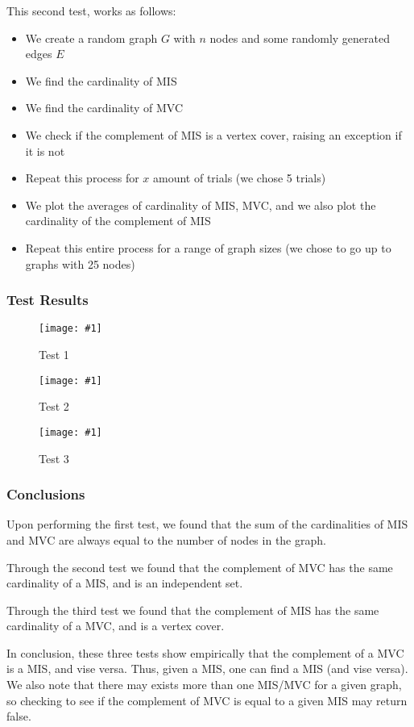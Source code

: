 \documentclass[12pt]{article}
\newcommand{\firgureBuffered}[2]
{
    \begin{figure}[ht!]
        \centering
        \texttt{[image: \#1]}
        \caption{#2}
    \end{figure}
}
\begin{document}
This second test, works as follows:

\begin{itemize}
    \item We create a random graph $G$ with $n$ nodes and some randomly generated edges $E$
    \item We find the cardinality of MIS
    \item We find the cardinality of MVC
    \item We check if the complement of MIS is a vertex cover, raising an exception if it is not
    \item Repeat this process for $x$ amount of trials (we chose 5 trials)
    \item We plot the averages of cardinality of MIS, MVC, and we also plot the cardinality of the complement of MIS
    \item Repeat this entire process for a range of graph sizes (we chose to go up to graphs with 25 nodes)
\end{itemize}


\subsubsection{Test Results}

\FloatBarrier{}
\firgureBuffered{images/IndSet/Figure_1.png}{Test 1}
\firgureBuffered{images/IndSet/Figure_2.png}{Test 2}
\firgureBuffered{images/IndSet/Figure_3.png}{Test 3}
\FloatBarrier{}

\subsubsection{Conclusions}
Upon performing the first test, we found that the sum of the cardinalities of MIS and MVC are always equal
to the number of nodes in the graph. 

Through the second test we found that the complement of MVC has the same cardinality of a MIS, and is an independent set.

Through the third test we found that the complement of MIS has the same cardinality of a MVC, and is a vertex cover.

In conclusion, these three tests show empirically that the complement of a MVC is a MIS, and vise versa. Thus, given a MIS, 
one can find a MIS (and vise versa). We also note that there may exists more than one MIS/MVC for a given graph, so checking 
to see if the complement of MVC is equal to a given MIS may return false. 
\end{document}
